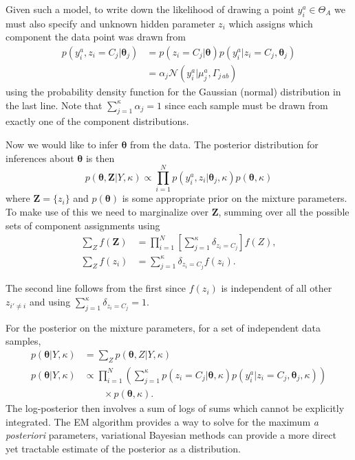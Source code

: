\documentclass[aps,showpacs,twocolumn,prd,superscriptaddress,nofootinbib]{revtex4}
\newcommand{\be}{\begin{equation}}
\newcommand{\ee}{\end{equation}}
\newcommand{\nn}{\nonumber}
\begin{document}
Given such a model, to write down the likelihood of drawing a point $y_i^a\in\Theta_A$ we must also specify and unknown hidden parameter $z_i$ which assigns which component the data point was drawn from
\begin{align}
  p(y_i^a,z_i{=}C_j|\bm\theta_j)
  &={p(z_i{=}C_j|\bm\theta)p(y_i^a|z_i{=}C_j,\bm\theta_j)}\nn\\
  &={\alpha_j\mathcal{N}(y_i^a|\mu_j^a,\Gamma_{j\,ab})}\label{eq:GMM-like}
\end{align}
using the probability density function for the Gaussian (normal) distribution in the last line.  Note that $\sum_{j=1}^\kappa\alpha_j=1$ since each sample must be drawn from exactly one of the component distributions.

Now we would like to infer $\bm\theta$ from the data. The posterior distribution for inferences about $\bm\theta$ is then
\be
p(\bm\theta,\bm Z|Y,\kappa)\propto\prod_{i=1}^Np(y_i^a,z_i|\bm\theta_j,\kappa)p(\bm\theta,\kappa)
\ee
where $\bm Z=\{z_i\}$ and $p(\bm\theta)$ is some appropriate prior on the mixture parameters.
To make use of this we need to marginalize over $\bm Z$, summing over all the possible sets of component assignments using
\begin{align}
  \sum_Z f(\bm Z)&=\prod_{i=1}^N\left[\sum_{j=1}^\kappa\delta_{z_i{=}C_j}\right]f(Z),\\
  \sum_Z f(z_i)&=\sum_{j=1}^\kappa\delta_{z_i{=}C_j}f(z_i).
\end{align}
    
The second line follows from the first since $f(z_i)$ is independent of all other $z_{i'\neq i}$ and using $\sum_{j=1}^\kappa{\delta_{z_i{=}C_j}}=1$.

For the posterior on the mixture parameters, for a set of independent data samples,
\begin{align}
  p(\bm\theta|Y,\kappa)&=\sum_{Z} p(\bm\theta,Z|Y,\kappa)\\
  p(\bm\theta|Y,\kappa)&\propto\prod_{i=1}^N\left(\sum_{j=1}^\kappa{p(z_i{=}C_j|\bm\theta,\kappa)p(y_i^a|z_i{=}C_j,\bm\theta_j,\kappa)}\right)\nn\\
  &\qquad\times p(\bm\theta,\kappa).
\end{align}
The log-posterior then involves a sum of logs of sums which cannot be explicitly integrated.  The EM algorithm provides a way to solve for the maximum \textit{a posteriori} parameters, variational Bayesian methods can provide a more direct yet tractable estimate of the posterior as a distribution.
\end{document}
